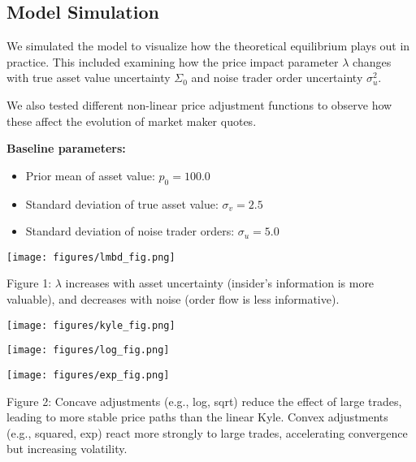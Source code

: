 \documentclass{beamer}
\begin{document}
\subsection{Model Simulation}
\begin{frame}
We simulated the model to visualize how the theoretical equilibrium plays out in practice. This included examining how the price impact parameter \( \lambda \) changes with true asset value uncertainty \( \Sigma_0 \) and noise trader order uncertainty \( \sigma_u^2 \).

We also tested different non-linear price adjustment functions to observe how these affect the evolution of market maker quotes.

\vspace{1em}
\textbf{Baseline parameters:}
\begin{itemize}
    \item Prior mean of asset value: \( p_0 = 100.0 \)
    \item Standard deviation of true asset value: \( \sigma_v = 2.5 \)
    \item Standard deviation of noise trader orders: \( \sigma_u = 5.0 \)
\end{itemize}
\end{frame}

\begin{frame}
\centering
\texttt{[image: figures/lmbd\_fig.png]}

\vspace{0.5em}
{\small {\textcolor[RGB]{41,49,202}{Figure 1:}} \(\lambda\) increases with asset uncertainty (insider’s information is more valuable), and decreases with noise (order flow is less informative).}
\end{frame}

\begin{frame}
\centering
\texttt{[image: figures/kyle\_fig.png]}

\vspace{0.5em}
\texttt{[image: figures/log\_fig.png]}

\vspace{0.5em}
\texttt{[image: figures/exp\_fig.png]}

\vspace{0.5em}
{\tiny {\textcolor[RGB]{41,49,202}{Figure 2:}} Concave adjustments (e.g., log, sqrt) reduce the effect of large trades, leading to more stable price paths than the linear Kyle. Convex adjustments (e.g., squared, exp) react more strongly to large trades, accelerating convergence but increasing volatility.}
\end{frame}
\end{document}
